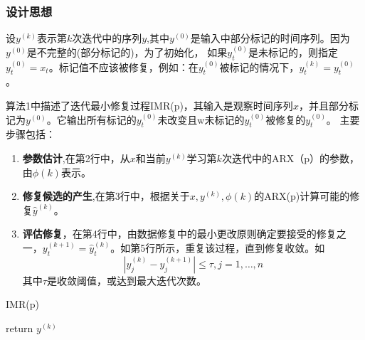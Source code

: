\documentclass[12pt,a4paper]{article}
\begin{document}
\subsubsection{设计思想}
设$y^{(k)}$表示第$k$次迭代中的序列$y$,其中$y^{(0)}$是输入中部分标记的时间序列。因为$y^{(0)}$是不完整的(部分标记的)，为了初始化，
如果$y_{t}^{(0)}$是未标记的，则指定$y_{t}^{(0)} = x_t$。标记值不应该被修复，例如：在$y_{t}^{(0)}$被标记的情况下，$y_{t}^{(k)}=y_{t}^{(0)}$。
\par
算法1中描述了迭代最小修复过程IMR(p)，其输入是观察时间序列$x$，并且部分标记为$y^{(0)}$。它输出所有标记的$y_{t}^{(0)}$未改变且w未标记的$y_{t}^{(0)}$被修复的$y_{t}^{(0)}$。
主要步骤包括：
\begin{enumerate}
    \item \textbf{参数估计},在第2行中，从$x$和当前$y^{(k)}$学习第$k$次迭代中的ARX（p）的参数，由$\phi(k)$表示。
    \item \textbf{修复候选的产生},在第3行中，根据关于$x,y^{(k)},\phi(k)$的ARX(p)计算可能的修复$\hat{y}^{(k)}$。
    \item \textbf{评估修复}，在第4行中，由数据修复中的最小更改原则确定要接受的修复之一，$y_{t}^{(k+1)}=\hat{y}_{t}^{(k)}$。如第5行所示，重复该过程，直到修复收敛。如$$\left|y_{j}^{(k)}-y_{j}^{(k+1)}\right| \leq \tau, j=1, \ldots, n$$其中$\tau$是收敛阈值，或达到最大迭代次数。
\end{enumerate}

\begin{algorithm}[h]
\caption{IMR(p)}
\LinesNumbered %
return $y^{(k)}$
\end{algorithm}
\end{document}
